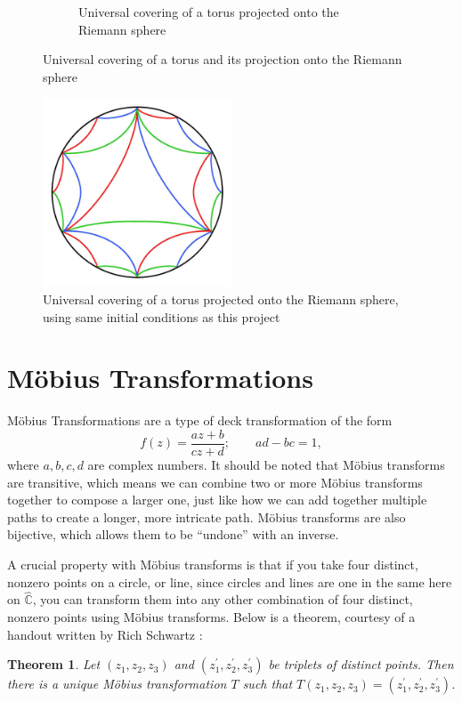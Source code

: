 \documentclass[12pt,a4paper,reqno,parskip=full]{amsart}
\numberwithin{equation}{section}
\theoremstyle{plain}
\newtheorem{theorem}[subsection]{Theorem}
\theoremstyle{definition}
\def\C{{\mathbb C}}
\begin{document}
\begin{figure}
\begin{subfigure}[b]{0.4\textwidth}
         \caption{Universal covering of a torus projected onto the Riemann sphere}
         \label{fig:tesselated}
     \end{subfigure}
        \caption{Universal covering of a torus and its projection onto the Riemann sphere}
        \label{fig:universal-covering}
\end{figure}


\begin{figure}
    \centering
    \captionsetup{justification=centering}
    \includegraphics[width=0.5\textwidth]{images/RS colored detailed 2.jpg}
    \caption{Universal covering of a torus projected onto the Riemann sphere, using same initial conditions as this project}
    \label{fig:universal-covering-2}
\end{figure}

\section{Möbius Transformations}

Möbius Transformations are a type of deck transformation of the form \[f(z)=\frac{az+b}{cz+d};\quad\quad ad-bc=1,\]
where $a,b,c,d$ are complex numbers. It should be noted that Möbius transforms are transitive, which means we can combine two or more Möbius transforms together to compose a larger one, just like how we can add together multiple paths to create a longer, more intricate path. Möbius transforms are also bijective, which allows them to be ``undone'' with an inverse.

A crucial property with Möbius transforms is that if you take four distinct, nonzero points on a circle, or line, since circles and lines are one in the same here on $\hat\C$, you can transform them into any other combination of four distinct, nonzero points using Möbius transforms. Below is a theorem, courtesy of a handout written by Rich Schwartz \cite{Schwartz_2007}:
\begin{theorem}Let $(z_1,z_2,z_3)$ and $(z_1^\prime,z_2^\prime,z_3^\prime)$ be triplets of distinct points. Then there is a unique Möbius transformation $T$ such that $T(z_1,z_2,z_3)=(z_1^\prime,z_2^\prime,z_3^\prime)$.
\end{theorem}
\end{document}
